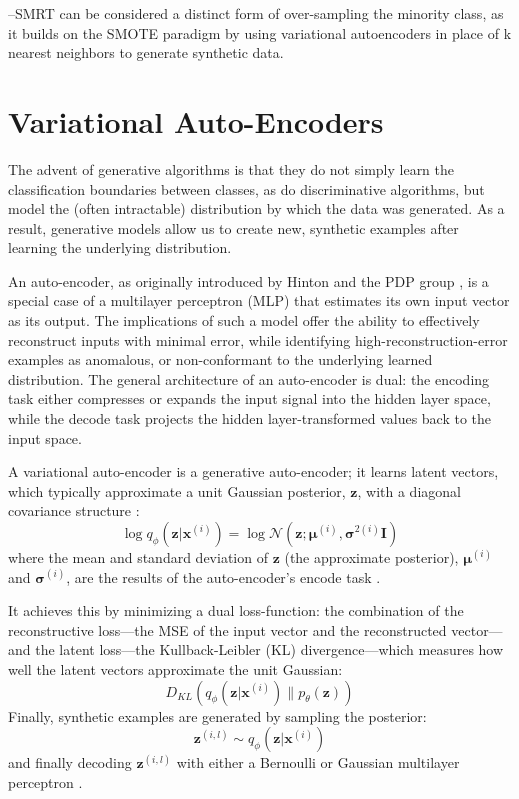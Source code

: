 \documentclass[twoside,11pt]{article}
\begin{document}
--SMRT can be considered a distinct form of over-sampling the minority class, as it builds on the SMOTE paradigm by using variational autoencoders in place of k nearest neighbors to generate synthetic data. 

\section{Variational Auto-Encoders}

The advent of generative algorithms is that they do not simply learn the classification boundaries between classes, as do discriminative algorithms, but model the (often intractable) distribution by which the data was generated. As a result, generative models allow us to create new, synthetic examples after learning the underlying distribution. 

An auto-encoder, as originally introduced by Hinton and the PDP group \citep{rumelhart1985learning}, is a special case of a multilayer perceptron (MLP) that estimates its own input vector as its output. The implications of such a model offer the ability to effectively reconstruct inputs with minimal error, while identifying high-reconstruction-error examples as anomalous, or non-conformant to the underlying learned distribution. The general architecture of an auto-encoder is dual: the encoding task either compresses or expands the input signal into the hidden layer space, while the decode task projects the hidden layer-transformed values back to the input space.


A variational auto-encoder is a generative auto-encoder; it learns latent vectors, which typically approximate a unit Gaussian posterior, $\mathbf{z}$, with a diagonal covariance structure \citep{kingma2013auto}:
\begin{equation}
    \log q_{\phi}(\mathbf{z}|\mathbf{x}^{(i)}) = \log \mathcal{N}(\mathbf{z}; \bm{\mu}^{(i)}, \bm{\sigma}^{2(i)}\mathbf{I})
\end{equation}
where the mean and standard deviation of $\mathbf{z}$ (the approximate posterior), $\bm{\mu}^{(i)}$ and $\bm{\sigma}^{(i)}$, are the results of the auto-encoder's encode task \citep{kingma2013auto}.

It achieves this by minimizing a dual loss-function: the combination of the reconstructive loss---the MSE of the input vector and the reconstructed vector---and the latent loss---the Kullback-Leibler (KL) divergence---which measures how well the latent vectors approximate the unit Gaussian:
\begin{equation}
    D_{KL}(q_{\phi}(\mathbf{z}|\mathbf{x}^{(i)})\parallel p_{\theta}(\mathbf{z}))
\end{equation}
Finally, synthetic examples are generated by sampling the posterior:
\begin{equation}
    \mathbf{z}^{(i,l)} \sim q_{\phi}(\mathbf{z}|\mathbf{x}^{(i)})
\end{equation}
and finally decoding $\mathbf{z}^{(i,l)}$ with either a Bernoulli or Gaussian multilayer perceptron \citep{kingma2013auto}.
\end{document}
